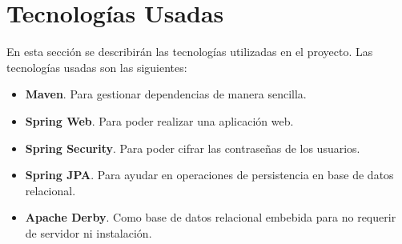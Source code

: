 \section{Tecnologías Usadas}

En esta sección se describirán las tecnologías utilizadas en el proyecto. Las tecnologías usadas son las siguientes:
\begin{itemize}
    \item \textbf{Maven}. Para gestionar dependencias de manera sencilla.
    \item \textbf{Spring Web}. Para poder realizar una aplicación web.
    \item  \textbf{Spring Security}. Para poder cifrar las contraseñas de los usuarios.
    \item \textbf{Spring JPA}. Para ayudar en operaciones de persistencia en base de datos relacional.
    \item \textbf{Apache Derby}. Como base de datos relacional embebida para no requerir de servidor ni instalación.
\end{itemize}